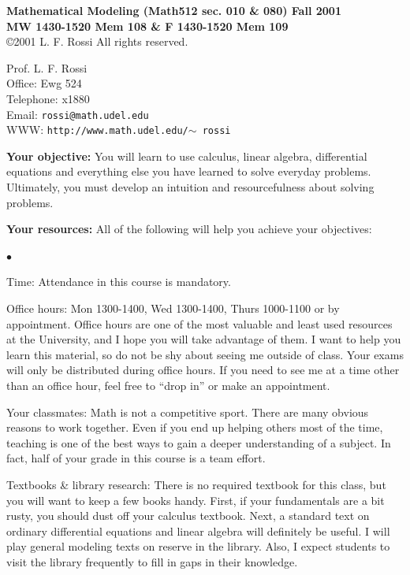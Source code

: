 \documentclass{article}
\begin{document}
 {\bf Mathematical Modeling (Math512 sec. 010 \& 080) \hfill Fall 2001 \\
MW 1430-1520 Mem 108 \& F 1430-1520 Mem 109} \\
\copyright 2001 L. F. Rossi \hspace{0.25in} All rights reserved.

\bigskip

 Prof. L. F. Rossi \\
Office: Ewg 524 \\
Telephone: x1880 \\
Email: {\tt rossi@math.udel.edu} \\
WWW: {\tt http://www.math.udel.edu/$\sim$ rossi}

\bigskip

 {\bf Your objective:} You will learn to use calculus, linear algebra,
differential equations and everything else you have learned to solve
everyday problems.  Ultimately, you must develop an intuition and
resourcefulness about solving problems.

\bigskip

 {\bf Your resources:} All of the following will help you achieve your
objectives:
\begin{list}{$\bullet$ }{}

\item Time: Attendance in this course is mandatory.

\item Office hours: Mon 1300-1400, Wed 1300-1400, Thurs 1000-1100 
or by appointment.
Office hours are one of the most valuable and least used resources at
the University, and I hope you will take advantage of them.  I want to
help you learn this material, so do not be shy about seeing me outside
of class.  Your exams will only be distributed during office hours.
If you need to see me at a time other than an office hour, feel free
to ``drop in'' or make an appointment.  

\item Your classmates: Math is not a competitive sport.  There are
many obvious reasons to work together.  Even if you end up helping
others most of the time, teaching is one of the best ways to gain a
deeper understanding of a subject.  In fact, half of your grade in
this course is a team effort.

\item Textbooks \& library research: 
There is no required textbook for this class, but you will want to
keep a few books handy.  First, if your fundamentals are a bit rusty,
you should dust off your calculus textbook.  Next, a standard text on
ordinary differential equations and linear algebra will definitely be
useful.  I will play general modeling texts on reserve in the
library.  Also, I
expect students to visit the library frequently to fill in gaps in
their knowledge.

\end{list}
\end{document}
